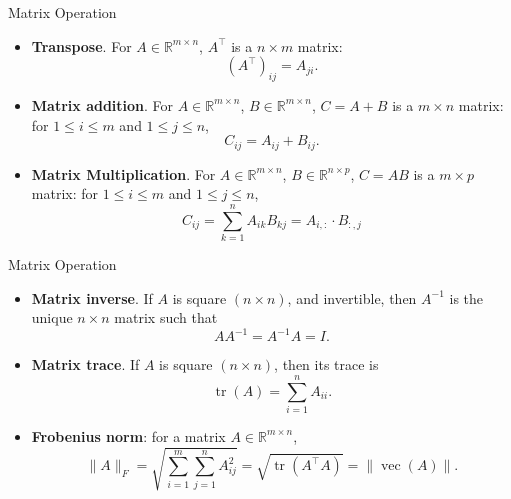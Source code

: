 \documentclass[10pt]{beamer}
\begin{document}
\begin{frame}{Matrix Operation}
    \begin{itemize}
        \item \textbf{Transpose}. For $A \in \mathbb{R}^{m \times n}$, $A^\top$ is a $n \times m$ matrix:
        \[
            (A^\top)_{ij} = A_{ji}. 
        \]
        \item \textbf{Matrix addition}. For $A \in \mathbb{R}^{m \times n}$, $B \in \mathbb{R}^{m \times n}$, $C = A + B$ is a $m \times n$ matrix: for $1 \le i \le m$ and $1 \le j \le n$,
        \[
            C_{ij} =  A_{ij} + B_{ij}. 
        \]
        \item \textbf{Matrix Multiplication}. For $A \in \mathbb{R}^{m \times n}$, $B \in \mathbb{R}^{n \times p}$, $C = AB$ is a $m \times p$ matrix: for $1 \le i \le m$ and $1 \le j \le n$,
        \[
            C_{ij} = \sum_{k = 1}^n A_{ik}B_{kj} = A_{i, :} \cdot B_{:, j}
        \]
    \end{itemize}
\end{frame}

\begin{frame}{Matrix Operation}
    \begin{itemize}
        \item \textbf{Matrix inverse}. If $A$ is square $(n \times n)$, and invertible, then $A^{-1}$ is the unique $n \times n$ matrix such that 
        \[
            AA^{-1} = A^{-1}A = I.
        \]
        \item \textbf{Matrix trace}.  If $A$ is square $(n \times n)$, then its trace is 
        \[
            \operatorname{tr}(A) = \sum_{i = 1}^n A_{ii}.
        \]
        \item \textbf{Frobenius norm}: for a matrix $A \in \mathbb{R}^{m \times n}$, 
        \[
            \|A\|_F = \sqrt{\sum_{i=1}^m \sum_{j = 1}^n A_{ij}^2} = \sqrt{\operatorname{tr}(A^\top A)} = \|\operatorname{vec}{(A)}\|.
        \]
    \end{itemize}
\end{frame}
\end{document}
